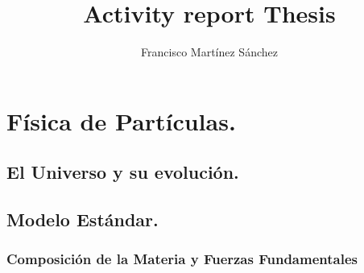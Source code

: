 \documentclass[12pt,english]{report}
\begin{document}
\title{Activity report Thesis}
\author{Francisco Martínez Sánchez}
\maketitle


\tableofcontents
\clearpage
\listoftables
\clearpage
\listoffigures
\clearpage

\begin{abstract}
\end{abstract}









\chapter{Física de Partículas.}


	\section{El Universo y su evolución.} 
	
	
	\section{Modelo Estándar.} 	
	
	
		\subsection{Composición de la Materia y Fuerzas Fundamentales} 
		
		
\end{document}
